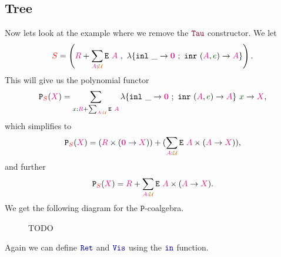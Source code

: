 \documentclass[twoside,11pt,openright]{report}
\theoremstyle{plain} %
\theoremstyle{definition}
\theoremstyle{remark}
\newcommand*{\term}[1]{\textcolor{green!30!black}{#1}} %
\newcommand*{\type}[1]{\textcolor{magenta!90!black}{#1}}
\newcommand*{\container}[1]{\textcolor{red}{#1}}
\newcommand*{\universe}[1]{\textcolor{orange!80!black}{#1}}
\newcommand*{\empt}{\type{\textbf{0}}}
\newcommand*{\function}[1]{\textcolor{blue!60!black}{\ensuremath{\mathtt{#1}}}}
\newcommand*{\constructor}[1]{\textcolor{purple!60!black}{\ensuremath{\mathtt{#1}}}}
\newcommand*{\typeformer}[1]{\ensuremath{\mathtt{#1}}}
\newcommand*{\functor}[1]{\ensuremath{\mathbf{\mathtt{#1}}}}
\begin{document}
\subsection{Tree}
Now lets look at the example where we remove the \(\constructor{Tau}\) constructor. We let
\begin{equation}
  \container{S} = \left(\type{R} + \sum_{\type{A} : \universe{\mathcal{U}}} \typeformer{E}~\type{A}~,~\lambda \{ \texttt{inl}~\_ \rightarrow \empt ~;~ \texttt{inr}~(\type{A},\term{e}) \rightarrow \type{A} \} \right).
\end{equation}
This will give us the polynomial functor
\begin{equation}
  \functor{P}_{\container{S}}(\type{X}) = \sum_{\term{x} : \type{R} + \sum_{\type{A} : \universe{\mathcal{U}}} \typeformer{E}~\type{A}} \lambda \{ \texttt{inl}~\_ \rightarrow \empt ~;~ \texttt{inr}~(\type{A},\term{e}) \rightarrow \type{A} \}~\term{x} \rightarrow \type{X},
\end{equation}
which simplifies to
\begin{equation}
  \functor{P}_{\container{S}}(\type{X}) = (\type{R} \times (\empt \rightarrow \type{X})) + (\sum_{\type{A} : \universe{\mathcal{U}}} \typeformer{E}~\type{A} \times (\type{A} \rightarrow \type{X})),
\end{equation}
and further
\begin{equation}
  \functor{P}_{\container{S}}(\type{X}) = \type{R} + \sum_{\type{A} : \universe{\mathcal{U}}} \typeformer{E}~\type{A} \times (\type{A} \rightarrow \type{X}).
\end{equation}
We get the following diagram for the \(\functor{P}\)-coalgebra.

\begin{figure}[h]
  \centering
  \caption{TODO}
\end{figure}
\noindent Again we can define \(\function{Ret}\) and \(\function{Vis}\) using the \(\function{in}\) function.
\end{document}
